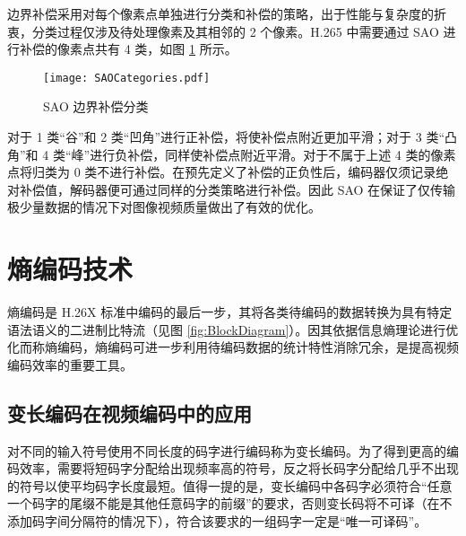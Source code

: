 边界补偿采用对每个像素点单独进行分类和补偿的策略，出于性能与复杂度的折衷，分类过程仅涉及待处理像素及其相邻的 2 个像素。H.265 中需要通过 SAO 进行补偿的像素点共有 4 类，如图 \ref{fig:SAOCategories} 所示。
\begin{figure}[hbt]
    \centering
    \texttt{[image: SAOCategories.pdf]}
    \caption{SAO 边界补偿分类}
    \label{fig:SAOCategories}
\end{figure}

对于 1 类“谷”和 2 类“凹角”进行正补偿，将使补偿点附近更加平滑；对于 3 类“凸角”和 4 类“峰”进行负补偿，同样使补偿点附近平滑。对于不属于上述 4 类的像素点将归类为 0 类不进行补偿。在预先定义了补偿的正负性后，编码器仅须记录绝对补偿值，解码器便可通过同样的分类策略进行补偿。因此 SAO 在保证了仅传输极少量数据的情况下对图像视频质量做出了有效的优化。

\section{熵编码技术}
熵编码是 H.26X 标准中编码的最后一步，其将各类待编码的数据转换为具有特定语法语义的二进制比特流（见图 \ref{fig:BlockDiagram}）。因其依据信息熵理论进行优化而称熵编码，熵编码可进一步利用待编码数据的统计特性消除冗余，是提高视频编码效率的重要工具。

\subsection{变长编码在视频编码中的应用}
对不同的输入符号使用不同长度的码字进行编码称为变长编码。为了得到更高的编码效率，需要将短码字分配给出现频率高的符号，反之将长码字分配给几乎不出现的符号以使平均码字长度最短。值得一提的是，变长编码中各码字必须符合“任意一个码字的尾缀不能是其他任意码字的前缀”的要求，否则变长码将不可译（在不添加码字间分隔符的情况下），符合该要求的一组码字一定是“唯一可译码”。

